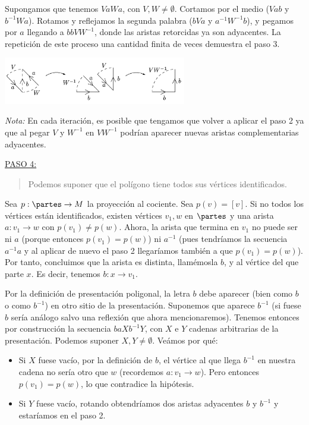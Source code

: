 {    \noindent
    Supongamos que tenemos $VaWa$, con $V,W \ne \emptyset$. Cortamos por el medio ($Vab$ y $b^{-1}Wa$). 
    Rotamos y reflejamos la segunda palabra ($bVa$ y $a^{-1}W^{-1}b$), y pegamos por $a$ llegando a $bbVW^{-1}$, donde las aristas retorcidas ya son adyacentes. 
    La repetición de este proceso una cantidad finita de veces demuestra el paso 3.
    
    \begin{center}
        \includegraphics[width=0.6\textwidth]{img/teorema-clasificacion/paso3.png}
    \end{center}

    \noindent
    \textit{Nota:} En cada iteración, es posible que tengamos que volver a aplicar el paso 2 ya que al pegar $V$ y $W^{-1}$ en $VW^{-1}$ podrían aparecer nuevas aristas complementarias adyacentes.

    \vspace{1.3em}
    \noindent
    \underline{PASO 4:}
    \begin{quote}
        Podemos suponer que el polígono tiene todos sus vértices identificados.
    \end{quote}

    \noindent
    Sea $p:\partes \to M$ la proyección al cociente. Sea $p(v)=[v]$. 
    Si no todos los vértices están identificados, existen vértices $v_1, w$ en $\partes$ 
    y una arista $ a : v_1 \to w$ con $p(v_1)\ne p(w)$. 
    Ahora, la arista que termina en $v_1$ no puede ser ni $a$ (porque entonces $p(v_1) = p(w)$) 
    ni $a^{-1}$ (pues tendríamos la secuencia $a^{-1} a$ y al aplicar de nuevo el paso 2 llegaríamos también a que $p(v_1) = p(w)$). 
    Por tanto, concluimos que la arista es distinta, llamémosla $b$, y al vértice del que parte $x$. 
    Es decir, tenemos $b : x \to v_1$.

    \vspace{0.5em}
    \noindent
    Por la definición de presentación poligonal, la letra $b$ debe aparecer (bien como $b$ o como $b^{-1}$) en otro sitio de la presentación. 
    Suponemos que aparece $b^{-1}$ (si fuese $b$ sería análogo salvo una reflexión que ahora mencionaremos). 
    Tenemos entonces por construcción la secuencia $baXb^{-1}Y$, con $X$ e $Y$ cadenas arbitrarias de la presentación. Podemos suponer $X,Y \ne \emptyset$. Veámos por qué:
    \begin{itemize}
        \item Si $X$ fuese vacío, por la definición de $b$, el vértice al que llega $b^{-1}$ en nuestra cadena no sería otro que $w$ (recordemos $a:v_1\to w$). 
              Pero entonces $p(v_1) = p(w)$, lo que contradice la hipótesis.
        \item Si $Y$ fuese vacío, rotando obtendríamos dos aristas adyacentes $b$ y $b^{-1}$ y estaríamos en el paso 2.
    \end{itemize}

}
